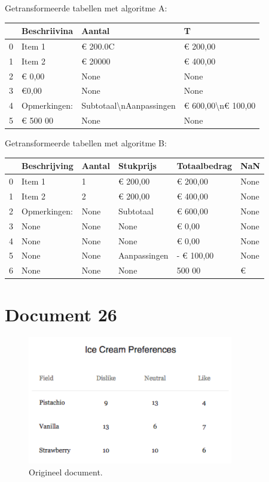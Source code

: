 Getransformeerde tabellen met algoritme A:

\begin{tabular}{llll}
\toprule
{} &  Beschriivina &                   Aantal &                   T \\
\midrule
0 &        Item 1 &                 € 200.0C &            € 200,00 \\
1 &        Item 2 &                  € 20000 &            € 400,00 \\
2 &        € 0,00 &                     None &                None \\
3 &         €0,00 &                     None &                None \\
4 &  Opmerkingen: &  Subtotaal\textbackslash nAanpassingen &  € 600,00\textbackslash n€ 100,00 \\
5 &      € 500 00 &                     None &                None \\
\bottomrule
\end{tabular}

Getransformeerde tabellen met algoritme B:

\begin{tabular}{llllll}
\toprule
{} &  Beschrijving & Aantal &     Stukprijs & Totaalbedrag &   NaN \\
\midrule
0 &        Item 1 &      1 &      € 200,00 &     € 200,00 &  None \\
1 &        Item 2 &      2 &      € 200,00 &     € 400,00 &  None \\
2 &  Opmerkingen: &   None &     Subtotaal &     € 600,00 &  None \\
3 &          None &   None &          None &       € 0,00 &  None \\
4 &          None &   None &          None &       € 0,00 &  None \\
5 &          None &   None &  Aanpassingen &   - € 100,00 &  None \\
6 &          None &   None &          None &       500 00 &     € \\
\bottomrule
\end{tabular}
\section{Document 26}

\begin{figure}[H]
    \centering
    \includegraphics[width=0.8\textwidth]{test-resultaten/26/original.jpg}
    \caption{Origineel document.}
\end{figure}

